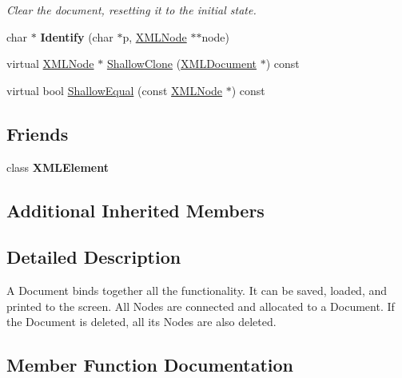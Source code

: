 \begin{DoxyCompactItemize}
\begin{DoxyCompactList}\small\item\em Clear the document, resetting it to the initial state. \end{DoxyCompactList}\item 
char $\ast$ {\bfseries Identify} (char $\ast$p, \hyperlink{classtinyxml2_1_1_x_m_l_node}{X\+M\+L\+Node} $\ast$$\ast$node)\hypertarget{classtinyxml2_1_1_x_m_l_document_af255cf899d2bf5dbae54c9b6de9c2752}{}\label{classtinyxml2_1_1_x_m_l_document_af255cf899d2bf5dbae54c9b6de9c2752}

\item 
virtual \hyperlink{classtinyxml2_1_1_x_m_l_node}{X\+M\+L\+Node} $\ast$ \hyperlink{classtinyxml2_1_1_x_m_l_document_a57c8511ed9f83aa3e20909a3db3f83d0}{Shallow\+Clone} (\hyperlink{classtinyxml2_1_1_x_m_l_document}{X\+M\+L\+Document} $\ast$) const 
\item 
virtual bool \hyperlink{classtinyxml2_1_1_x_m_l_document_a12eac66c6e45d074d5cc47319868cd66}{Shallow\+Equal} (const \hyperlink{classtinyxml2_1_1_x_m_l_node}{X\+M\+L\+Node} $\ast$) const 
\end{DoxyCompactItemize}
\subsection*{Friends}
\begin{DoxyCompactItemize}
\item 
class {\bfseries X\+M\+L\+Element}\hypertarget{classtinyxml2_1_1_x_m_l_document_ac2fba9b6e452829dd892f7392c24e0eb}{}\label{classtinyxml2_1_1_x_m_l_document_ac2fba9b6e452829dd892f7392c24e0eb}

\end{DoxyCompactItemize}
\subsection*{Additional Inherited Members}


\subsection{Detailed Description}
A Document binds together all the functionality. It can be saved, loaded, and printed to the screen. All Nodes are connected and allocated to a Document. If the Document is deleted, all its Nodes are also deleted. 

\subsection{Member Function Documentation}
